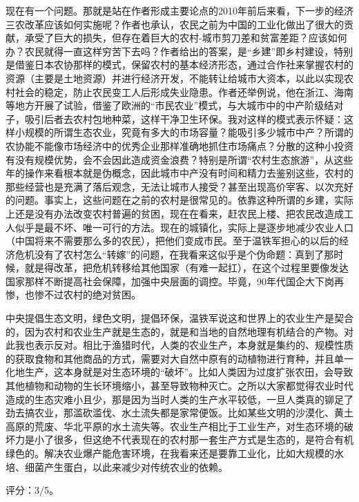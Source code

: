 现在有一个问题。那就是站在作者形成主要论点的2010年前后来看，下一步的经济三农改革应该如何实施呢？作者也承认，农民之前为中国的工业化做出了很大的贡献，承受了巨大的损失，但存在着巨大的农村-城市剪刀差和贫富差距？应该如何办？农民就得一直这样穷苦下去吗？作者给出的答案，是“乡建”即乡村建设，特别是借鉴日本农协那样的模式，保留农村的基本经济形态，通过合作社来掌握农村的资源（主要是土地资源）并进行经济开发，不能转让给城市大资本，以此以实现农村社会的稳定，防止农民变工人后形成失业隐患。作者还举例说，他在浙江、海南等地方开展了试验，借鉴了欧洲的“市民农业”模式，与大城市中的中产阶级结对子，吸引后者去农村包地种菜，这样干净卫生环保。我对这样的模式表示怀疑：这样小规模的所谓生态农业，究竟有多大的市场容量？能吸引多少城市中产？所谓的农协能不能像市场经济中的优秀企业那样准确地抓住市场痛点？分散的这种小投资有没有规模优势，会不会因此造成资金浪费？特别是所谓“农村生态旅游”，从这些年的操作来看根本就是伪概念，因此城市中产没有时间和精力去鉴别这些，农村的那些经营也是充满了落后观念，无法让城市人接受？甚至出现高价宰客、以次充好的问题。事实上，这些问题在之前的农村是很常见的。依靠这种所谓的乡建，实际上还是没有办法改变农村普遍的贫困，现在在看来，赶农民上楼、把农民改造成工人似乎是最不坏、唯一可行的方法。现在的城镇化，实际上是逐步地减少农业人口（中国将来不需要那么多的农民），把他们变成市民。至于温铁军担心的以后的经济危机没有了农村怎么“转嫁”的问题，在我看来这似乎是个伪命题：真到了那时候，就是得改革，把危机转移给其他国家（有难一起扛），在这个过程里要像发达国家那样不断提高社会保障，加强中央层面的调控。毕竟，90年代国企大下岗再惨，也惨不过农村的绝对贫困。

中央提倡生态文明，绿色文明，提倡环保，温铁军说这和世界上的农业生产是契合的，因为农村和农业生产就是生态的，就是和当地的自然地理有机结合的产物。对此我也表示反对。相比于渔猎时代，人类的农业生产，本身就是集约的、规模性质的获取食物和其他商品的方式，需要对大自然中原有的动植物进行育种，并且单一化地生产，这本身就是对生态环境的“破坏”。比如人类因为过度扩张农田，会导致其他植物和动物的生长环境缩小，甚至导致物种灭亡。之所以大家都觉得农业时代造成的生态灾难小且少，那是因为当时人类的生产水平较低，一旦人类真的铆足了劲去搞农业，那滥砍滥伐、水土流失都是家常便饭。比如某些文明的沙漠化、黄土高原的荒废、华北平原的水土流失等。农业生产相比于工业生产，对生态环境的破坏力是小了很多，但这绝不代表现在的农村那一套生产方式是生态的，是符合有机绿色的。解决农业爆产能危害环境，在我看来还是要靠工业化，比如大规模的水培、细菌产生蛋白，以此来减少对传统农业的依赖。

评分：3/5。